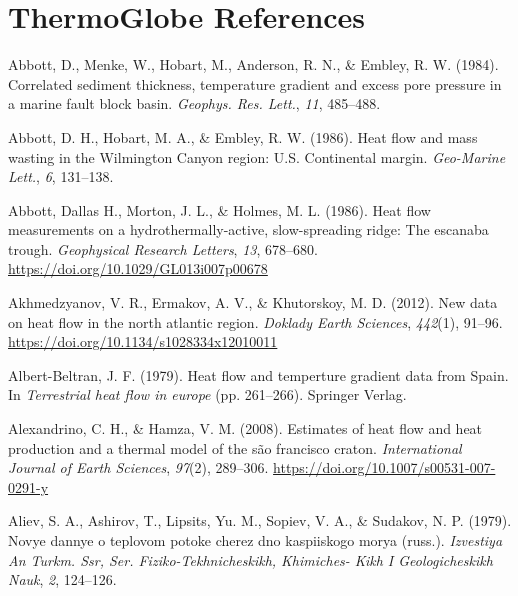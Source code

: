 \cleardoublepage

\hypertarget{tglobe}{%
\chapter*{ThermoGlobe References}\label{tglobe}}


\hypertarget{refs_tglobe}{}
\begin{CSLReferences}{1}{1}
\leavevmode{}%
Abbott, D., Menke, W., Hobart, M., Anderson, R. N., \& Embley, R. W. (1984). Correlated sediment thickness, temperature gradient and excess pore pressure in a marine fault block basin. \emph{Geophys. Res. Lett.}, \emph{11}, 485--488.

\leavevmode{}%
Abbott, D. H., Hobart, M. A., \& Embley, R. W. (1986). Heat flow and mass wasting in the {Wilmington Canyon} region: {U.S.} Continental margin. \emph{Geo-Marine Lett.}, \emph{6}, 131--138.

\leavevmode{}%
Abbott, Dallas H., Morton, J. L., \& Holmes, M. L. (1986). Heat flow measurements on a hydrothermally-active, slow-spreading ridge: The escanaba trough. \emph{Geophysical Research Letters}, \emph{13}, 678--680. \url{https://doi.org/10.1029/GL013i007p00678}

\leavevmode{}%
Akhmedzyanov, V. R., Ermakov, A. V., \& Khutorskoy, M. D. (2012). New data on heat flow in the north atlantic region. \emph{Doklady Earth Sciences}, \emph{442}(1), 91--96. \url{https://doi.org/10.1134/s1028334x12010011}

\leavevmode{}%
Albert-Beltran, J. F. (1979). Heat flow and temperture gradient data from {Spain}. In \emph{Terrestrial heat flow in europe} (pp. 261--266). Springer Verlag.

\leavevmode{}%
Alexandrino, C. H., \& Hamza, V. M. (2008). Estimates of heat flow and heat production and a thermal model of the são francisco craton. \emph{International Journal of Earth Sciences}, \emph{97}(2), 289--306. \url{https://doi.org/10.1007/s00531-007-0291-y}

\leavevmode{}%
Aliev, S. A., Ashirov, T., Lipsits, Yu. M., Sopiev, V. A., \& Sudakov, N. P. (1979). Novye dannye o teplovom potoke cherez dno kaspiiskogo morya (russ.). \emph{Izvestiya An Turkm. Ssr, Ser. Fiziko-Tekhnicheskikh, Khimiches- Kikh I Geologicheskikh Nauk}, \emph{2}, 124--126.


\end{CSLReferences}
